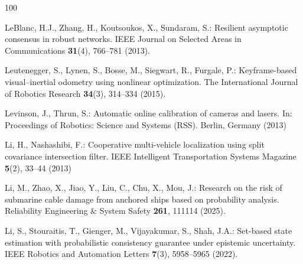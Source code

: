 \documentclass[graybox,envcountchap]{style/SNmono}
\begin{document}
\begin{thebibliography}{100}

LeBlanc, H.J., Zhang, H., Koutsoukos, X., Sundaram, S.: Resilient asymptotic
  consensus in robust networks.
\newblock IEEE Journal on Selected Areas in Communications \textbf{31}(4),
  766--781 (2013).
\newblock {}



Leutenegger, S., Lynen, S., Bosse, M., Siegwart, R., Furgale, P.:
  Keyframe-based visual--inertial odometry using nonlinear optimization.
\newblock The International Journal of Robotics Research \textbf{34}(3),
  314--334 (2015).
\newblock {}


{\color{red} 
Levinson, J., Thrun, S.: Automatic online calibration of cameras and lasers.
\newblock In: Proceedings of Robotics: Science and Systems (RSS). Berlin,
  Germany (2013)

\par}
{\color{red} 
Li, H., Nashashibi, F.: Cooperative multi-vehicle localization using split
  covariance intersection filter.
\newblock IEEE Intelligent Transportation Systems Magazine \textbf{5}(2),
  33--44 (2013)

\par}

Li, M., Zhao, X., Jiao, Y., Liu, C., Chu, X., Mou, J.: Research on the risk of
  submarine cable damage from anchored ships based on probability analysis.
\newblock Reliability Engineering \& System Safety \textbf{261}, 111114 (2025).
\newblock {}



Li, S., Stouraitis, T., Gienger, M., Vijayakumar, S., Shah, J.A.: Set-based
  state estimation with probabilistic consistency guarantee under epistemic
  uncertainty.
\newblock IEEE Robotics and Automation Letters \textbf{7}(3), 5958--5965
  (2022).
\newblock {}



\end{thebibliography}
\end{document}
